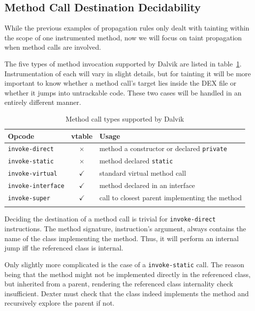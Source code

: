 \documentclass[12pt,twoside,notitlepage]{report}
\newcommand{\tick}{$\checkmark$}
\newcommand{\cross}{$\times$}
\begin{document}
\subsection{Method Call Destination Decidability}

While the previous examples of propagation rules only dealt with tainting within the scope of one instrumented method, now we will focus on taint propagation when method calls are involved. 

The five types of method invocation supported by Dalvik are listed in table~\ref{table:TaintPropagation_MethodCallTypes}. Instrumentation of each will vary in slight details, but for tainting it will be more important to know whether a method call's target lies inside the DEX file or whether it jumps into untrackable code. These two cases will be handled in an entirely different manner. 

\begin{table}[h]
	\begin{center}
	\begin{tabular}{|l|c|l|}
		\firsthline
		\textbf{Opcode}         & \footnotesize{\textbf{vtable}} & \textbf{Usage} \\
		\hline
		\verb$invoke-direct$    & \cross          & method a constructor or declared \verb$private$ \\
		\verb$invoke-static$    & \cross          & method declared \verb$static$ \\
		\hline
		\verb$invoke-virtual$   & \tick           & standard virtual method call \\
		\verb$invoke-interface$ & \tick           & method declared in an interface \\
		\verb$invoke-super$     & \tick           & call to closest parent implementing the method \\
		\lasthline
	\end{tabular}
	\end{center}
	\caption{Method call types supported by Dalvik}
	\label{table:TaintPropagation_MethodCallTypes}
\end{table}

Deciding the destination of a method call is trivial for \verb$invoke-direct$ instructions. The method signature, instruction's argument, always contains the name of the class implementing the method. Thus, it will perform an internal jump iff the referenced class is internal.

Only slightly more complicated is the case of a \verb$invoke-static$ call. The reason being that the method might not be implemented directly in the referenced class, but inherited from a parent, rendering the referenced class internality check insufficient. Dexter must check that the class indeed implements the method and recursively explore the parent if not.
\end{document}
